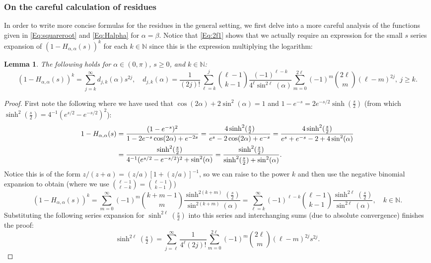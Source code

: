 \documentclass[letterpaper,10pt]{amsart}
\newtheorem{lem}[thm]{Lemma}
\numberwithin{equation}{section}
\begin{document}
\subsubsection{On the careful calculation of residues}

In order to write more concise formulas for the residues in the general setting, we first delve into a more careful analysis of the functions given in \eqref{Eq:squareroot} and \eqref{Eq:Halpha} for $\alpha=\beta$.
Notice that \eqref{Eq:2f1} shows that we actually require an expression for the small $s$ series expansion of $(1-H_{\alpha,\alpha}(s))^k$ for each $k\in\mathbb{N}$ since this is the expression multiplying the logarithm:

\begin{lem}\label{Lem:Hkexp}
The following holds for $\alpha\in(0,\pi)$, $s\geq0$, and $k\in\mathbb{N}$:
\begin{equation}
(1-H_{\alpha,\alpha}(s))^k=\sum_{j=k}^\infty d_{j,k}(\alpha) s^{2j},\quad d_{j,k}(\alpha)=\frac{1}{(2j)!}\sum_{\ell=k}^{j}\binom{\ell-1}{k-1}\frac{(-1)^{\ell-k}}{4^\ell \sin^{2\ell}(\alpha)}
\sum_{m=0}^{2\ell}
(-1)^m
\binom{2\ell}{m}
(\ell-m)^{2j},\ j\geq k.
\end{equation}
\end{lem}
\begin{proof}
First note the following where we have used that $\cos(2\alpha)+2\sin^2(\alpha)=1$ and $1-e^{-s}=2e^{-s/2}\sinh(\tfrac{s}{2})$ (from which $\sinh^2(\tfrac{s}{2})=4^{-1}(e^{s/2}-e^{-s/2})^2$):
\begin{align}
1-H_{\alpha,\alpha}(s)&=\frac{(1-e^{-s})^2}{1-2e^{-s}\cos(2\alpha)+e^{-2s}}=\frac{4\sinh^2(\tfrac{s}{2})}{e^{s}-2\cos(2\alpha)+e^{-s}}=\frac{4\sinh^2(\tfrac{s}{2})}{e^{s}+e^{-s}-2+4\sin^2(\alpha)}\notag\\
&=\frac{\sinh^2(\tfrac{s}{2})}{4^{-1}(e^{s/2}-e^{-s/2})^2+\sin^2(\alpha)}=\frac{\sinh^2(\tfrac{s}{2})}{\sinh^2(\tfrac{s}{2})+\sin^2(\alpha)}.
\end{align}
Notice this is of the form $z/(z+a)=(z/a)[1+(z/a)]^{-1}$, so we can raise to the power $k$ and then use the negative binomial expansion to obtain (where we use $\binom{\ell-1}{\ell-k}=\binom{\ell-1}{k-1}$)
\begin{equation}
(1-H_{\alpha,\alpha}(s))^k=\sum_{m=0}^\infty (-1)^m\binom{k+m-1}{m}\frac{\sinh^{2(k+m)}(\tfrac{s}{2})}{\sin^{2(k+m)}(\alpha)}=\sum_{\ell=k}^\infty (-1)^{\ell-k}\binom{\ell-1}{k-1}\frac{\sinh^{2\ell}(\tfrac{s}{2})}{\sin^{2\ell}(\alpha)},\quad k\in\mathbb{N}.
\end{equation}
Substituting the following series expansion for $\sinh^{2\ell}(\tfrac{s}{2})$ into this series and interchanging sums (due to absolute convergence) finishes the proof:
\begin{equation}
\sinh^{2\ell}(\tfrac{s}{2})=\sum_{j=\ell}^\infty \frac{1}{4^\ell (2j)!}
\sum_{m=0}^{2\ell}
(-1)^m
\binom{2\ell}{m}
(\ell-m)^{2j}s^{2j}.
\end{equation}
\end{proof}
\end{document}
